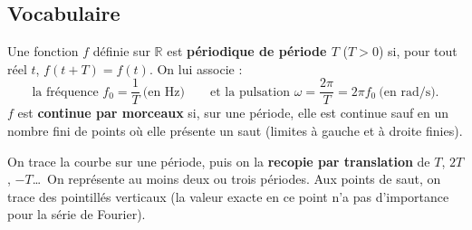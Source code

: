 \documentclass[a4paper,11pt]{article}
\begin{document}
\subsection{Vocabulaire}\label{subsec:vocabulaire}

\begin{definition}
Une fonction $f$ définie sur $\mathbb{R}$ est \textbf{périodique de période $T$} ($T>0$) si, pour tout réel $t$, $f(t+T) = f(t)$. On lui associe :
\[
\text{la fréquence } f_0 = \frac{1}{T} \ \text{(en Hz)} \qquad\text{et la pulsation } \omega = \frac{2\pi}{T} = 2\pi f_0 \ \text{(en rad/s).}
\]
$f$ est \textbf{continue par morceaux} si, sur une période, elle est continue sauf en un nombre fini de points où elle présente un saut (limites à gauche et à droite finies).
\end{definition}

\begin{methode}\label{meth:representer}
On trace la courbe sur une période, puis on la \textbf{recopie par translation} de $T$, $2T$, $-T$\dots\ On représente au moins deux ou trois périodes. Aux points de saut, on trace des pointillés verticaux (la valeur exacte en ce point n'a pas d'importance pour la série de Fourier).
\end{methode}
\end{document}
